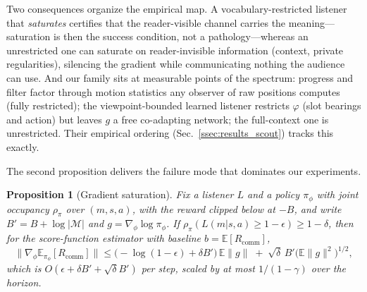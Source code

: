 \documentclass[sigconf,review,anonymous]{acmart}
\newtheorem{proposition}{Proposition}
\newcommand{\Rcomm}{R_{\text{comm}}}
\begin{document}
Two consequences organize the empirical map. A vocabulary-restricted listener that \emph{saturates} certifies that the reader-visible channel carries the meaning---saturation is then the success condition, not a pathology---whereas an unrestricted one can saturate on reader-invisible information (context, private regularities), silencing the gradient while communicating nothing the audience can use. And our family sits at measurable points of the spectrum: progress and filter factor through motion statistics any observer of raw positions computes (fully restricted); the viewpoint-bounded learned listener restricts $\varphi$ (slot bearings and action) but leaves $g$ a free co-adapting network; the full-context one is unrestricted. Their empirical ordering (Sec.~\ref{ssec:results_scout}) tracks this exactly.

The second proposition delivers the failure mode that dominates our experiments.

\begin{proposition}[Gradient saturation]
\label{prop:saturation}
Fix a listener $L$ and a policy $\pi_\phi$ with joint occupancy $\rho_\pi$ over $(m,s,a)$, with the reward clipped below at $-B$, and write $B' = B + \log|\mathcal{M}|$ and $g = \nabla_\phi \log \pi_\phi$. If $\rho_\pi\!\left(L(m|s,a) \geq 1-\epsilon\right) \geq 1-\delta$, then for the score-function estimator with baseline $b = \mathbb{E}[\Rcomm]$,
\begin{equation}
\big\|\nabla_\phi \mathbb{E}_{\pi_\phi}[\Rcomm]\big\| \leq \big(\!-\!\log(1-\epsilon) + \delta B'\big)\, \mathbb{E}\|g\| \;+\; \sqrt{\delta}\, B' \big(\mathbb{E}\|g\|^2\big)^{1/2},
\end{equation}
which is $O(\epsilon + \delta B' + \sqrt{\delta} B')$ per step, scaled by at most $1/(1-\gamma)$ over the horizon.
\end{proposition}
\end{document}
